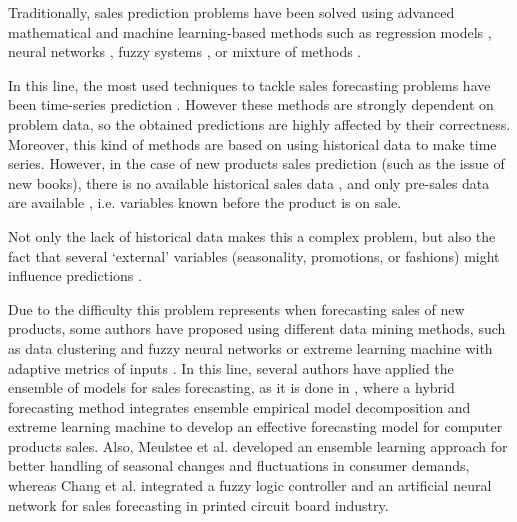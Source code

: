 \documentclass[a4paper,10pt,onecolumn,preprint,3p]{elsarticle}
\begin{document}
Traditionally, sales prediction problems have been solved using advanced mathematical and machine learning-based methods
such as regression models \cite{Papalexopoulos1990}, neural networks \cite{Yoo1999}, fuzzy systems \cite{Mastorocostas2001}, or mixture of methods \cite{Chang2006715,Meulstee2008,ChiJie2012}.

In this line, the most used techniques to tackle sales forecasting problems have been time-series prediction
\cite{Chu2003,Brown1959,Winters1960,Box1969,Papalexopoulos1990}. %
However these methods are strongly dependent on problem data, so the obtained predictions are highly affected by their correctness.
Moreover, this kind of methods are based on using historical data to make time series. However, in the case of new products sales prediction (such as the issue of new books), there is no available historical sales data \cite{ChingChin2010}, 
and only pre-sales data are available \cite{FaderHardie2005,Madsen2008}, 
i.e. variables known before the product is on sale. 

Not only the lack of historical data makes this a complex problem, but also the fact that several `external' variables (seasonality, promotions, or fashions) might influence predictions
\cite{Lapide1999,Thomassey2012,Xia2012,SThomassey2014,ChernWSF15}.

Due to the difficulty this problem represents when forecasting sales of new 
products, some authors have proposed using different data mining methods, such as data clustering and fuzzy neural networks \cite{Chang2009} or extreme learning machine with adaptive metrics of inputs \cite{Xia2012}.
In this line, several authors have applied the ensemble of models for sales forecasting, 
as it is done in \cite{ChiJie2012}, where a hybrid forecasting method integrates ensemble empirical model decomposition and extreme learning machine 
to develop an effective forecasting model for computer products sales.
Also, Meulstee et al. \cite{Meulstee2008} developed an ensemble learning approach for better handling of seasonal changes and fluctuations in consumer demands, whereas Chang et al. \cite{Chang2006715} integrated a fuzzy logic controller and an artificial neural network for sales forecasting in printed circuit board industry.
\end{document}
